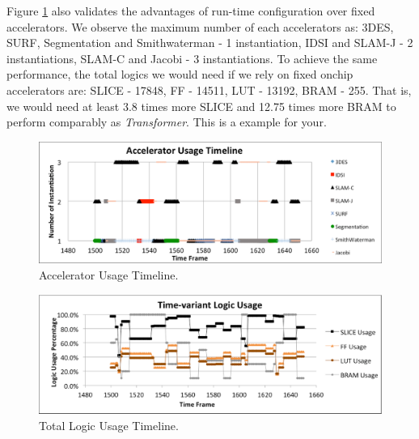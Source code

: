 Figure \ref{fig_acc_timeline}  also validates the advantages of run-time
configuration over fixed accelerators. We observe the maximum number of each
accelerators as: 3DES, SURF, Segmentation and Smithwaterman - 1
instantiation, IDSI and SLAM-J - 2 instantiations, SLAM-C and Jacobi -
3 instantiations. To achieve the same performance, the total logics we
would need if we rely on fixed onchip accelerators are: SLICE - 17848, FF
- 14511, LUT - 13192, BRAM - 255. That is, we would need at least 3.8 times
more SLICE and 12.75 times more BRAM to perform comparably as {\em Transformer}. 
This is a example for your.


\begin{figure}[ht]
    \centering
    \includegraphics[width=6.0in]{Acc_timeline}
    \caption{Accelerator Usage Timeline.}
    \label{fig_acc_timeline}
\end{figure}

\begin{figure}[ht]
    \centering
    \includegraphics[width=6.0in]{Logic-Usage-Timeline}
    \caption{Total Logic Usage Timeline.}
    \label{fig_logic_timeline}
\end{figure}
